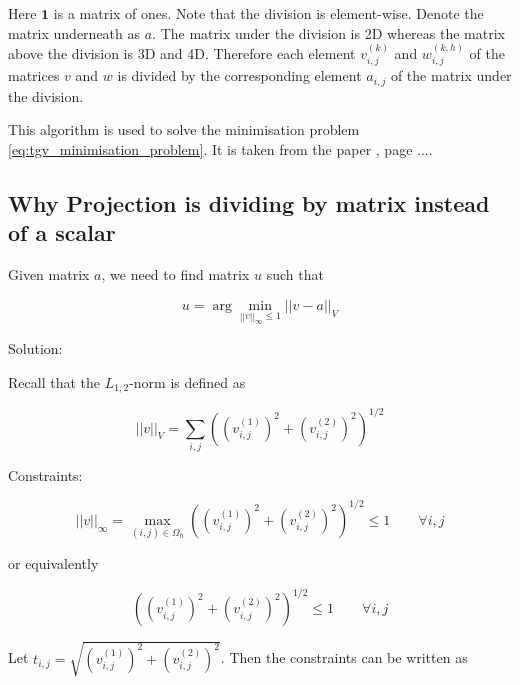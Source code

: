 \documentclass{article}
\begin{document}
Here $\mathbf{1}$ is a matrix of ones. 
Note that the division is element-wise.
Denote the matrix underneath as $a$.
The matrix under the division is 2D whereas the matrix above the division is 3D and 4D.
Therefore each element $v_{i,j}^{(k)}$ and $w_{i,j}^{(k,h)}$ of the matrices $v$ and $w$ is divided by the corresponding element $a_{i,j}$ of the matrix under the division.

\newline


This algorithm is used to solve the minimisation problem \ref{eq:tgv_minimisation_problem}.
It is taken from the paper \cite{recovering_piecewise_smooth_multichannel_images}, page ....



\subsection{Why Projection is dividing by matrix instead of a scalar}


Given matrix $a$, we need to find matrix $u$ such that

\begin{equation}
    u = \arg \min_{|| v ||_\infty \leq 1} || v - a ||_V
\end{equation}

Solution:

Recall that the $L_{1, 2}$-norm is defined as

\begin{equation}
    ||v||_V = \sum_{i,j} \left( \left(v_{i,j}^{(1)}\right)^2 + \left(v_{i,j}^{(2)}\right)^2 \right)^{1/2}
\end{equation}

Constraints:

\begin{equation}
    ||v||_\infty = \max_{(i,j) \in \Omega_h} \left( \left(v_{i,j}^{(1)}\right)^2 + \left(v_{i,j}^{(2)}\right)^2 \right)^{1/2} \leq 1  \quad  \quad  \forall i, j
\end{equation}

or equivalently

\begin{equation}
    \left( \left(v_{i,j}^{(1)}\right)^2 + \left(v_{i,j}^{(2)}\right)^2 \right)^{1/2} \leq 1  \quad  \quad  \forall i, j
\end{equation}


Let $t_{i,j} = \sqrt{(v_{i,j}^{(1)})^2 + (v_{i,j}^{(2)})^2}$.
Then the constraints can be written as
\end{document}
